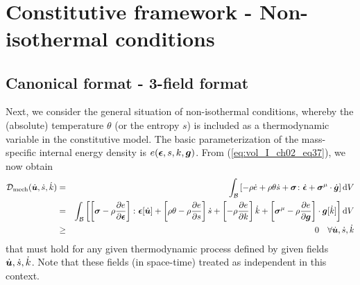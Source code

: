 \


\section{Constitutive framework - Non-isothermal conditions}

\subsection{Canonical format - 3-field format}

Next, we consider the general situation of non-isothermal conditions,
 whereby the (absolute) temperature $\theta$ (or the entropy $s$) is 
 included as a thermodynamic variable in the constitutive model. 
 The basic parameterization of the mass-specific internal energy density
  is $e(\bm{\epsilon},s,k,\bm {g})$. From (\ref{eq:vol_I_ch02_eq37}), we now obtain
\begin{eqnarray}
    {\mathcal D}_{\mathrm{mech}}(\dot{\bm {u}},\dot{s},\dot{k})
    &=&
    \int_{\mathcal{B}}  \left[-\rho\dot{e} + \rho\theta\dot{s} + 
    \bm{\sigma}\colon\dot{\bm{\epsilon}} + \bm{\sigma}^{\mathrm{\mu}} \cdot \dot{\bm g}\right]  \mathop{}\!\mathrm{d} V
    \nonumber \\
    &=&
    \int_{\mathcal{B}} \left[ \left[\bm{\sigma} -\rho\frac{\partial e}{\partial \bm{\epsilon}}\right]
     \colon \bm{\epsilon}[\dot{\bm {u}}]+ \left[\rho\theta - \rho\frac{\partial e}{\partial s}  \right] 
     \dot{s}+ \left[-\rho\frac{\partial e}{\partial k}\right] \dot{k} + \left[\bm{\sigma}^{\mathrm{\mu}} -
     \rho\frac{\partial e}{\partial \bm {g}}\right] \cdot \bm {g}[\dot{k}] \right]\mathop{}\!\mathrm{d} V
    \nonumber \\
    &\geq&  0
    \quad \forall \dot{\bm {u}},\dot{s},\dot{k}
\label{eq:8-201}
\end{eqnarray}
that must hold for any given thermodynamic process defined by given fields
 $\dot{\bm {u}},\dot{s},\dot{k}$. Note that these fields (in space-time) treated 
 as independent in this context.

